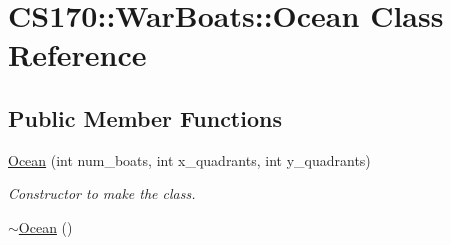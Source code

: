 \hypertarget{class_c_s170_1_1_war_boats_1_1_ocean}{\section{C\-S170\-:\-:War\-Boats\-:\-:Ocean Class Reference}
\label{class_c_s170_1_1_war_boats_1_1_ocean}
}
\subsection*{Public Member Functions}
\begin{DoxyCompactItemize}
\item 
\hyperlink{class_c_s170_1_1_war_boats_1_1_ocean_aa24370d9bdf2ffc1f57df283ec31d00a}{Ocean} (int num\-\_\-boats, int x\-\_\-quadrants, int y\-\_\-quadrants)
\begin{DoxyCompactList}\small\item\em Constructor to make the class. \end{DoxyCompactList}\item 
\hypertarget{class_c_s170_1_1_war_boats_1_1_ocean_a657f333fe90845012972ce4ee07e31f4}{\hyperlink{class_c_s170_1_1_war_boats_1_1_ocean_a657f333fe90845012972ce4ee07e31f4}{$\sim$\-Ocean} ()}\label{class_c_s170_1_1_war_boats_1_1_ocean_a657f333fe90845012972ce4ee07e31f4}


\end{DoxyCompactItemize}
